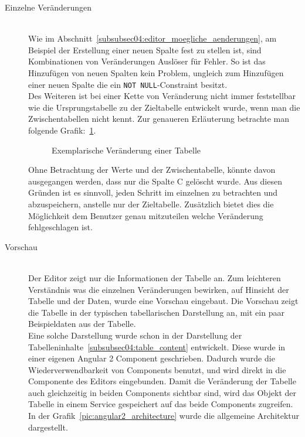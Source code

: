 \begin{description}
\item[Einzelne Veränderungen] \hfill\\
Wie im Abschnitt~\ref{subsubsec04:editor_moegliche_aenderungen}, am Beispiel der Erstellung einer neuen Spalte fest zu stellen ist, sind Kombinationen von Veränderungen Auslöser für Fehler. So ist das Hinzufügen von neuen Spalten kein Problem, ungleich zum Hinzufügen einer neuen Spalte die ein \texttt{NOT NULL}-Constraint besitzt. \\
Des Weiteren ist bei einer Kette von Veränderung nicht immer feststellbar wie die Ursprungstabelle zu der Zieltabelle entwickelt wurde, wenn man die Zwischentabellen nicht kennt.
Zur genaueren Erläuterung betrachte man folgende Grafik:~\ref{pic:table_chain_changes_example}. 

\begin{figure}[ht]
        \centering
        \caption{Exemplarische Veränderung einer Tabelle}
        \label{pic:table_chain_changes_example}
\end{figure}

Ohne Betrachtung der Werte und der Zwischentabelle, könnte davon ausgegangen werden, dass nur die Spalte C gelöscht wurde.
Aus diesen Gründen ist es sinnvoll, jeden Schritt im einzelnen zu betrachten und abzuspeichern, anstelle nur der Zieltabelle.
Zusätzlich bietet dies die Möglichkeit dem Benutzer genau mitzuteilen welche Veränderung fehlgeschlagen ist.


\item[Vorschau] \hfill\\
Der Editor zeigt nur die Informationen der Tabelle an. Zum leichteren Verständnis was die einzelnen Veränderungen bewirken, auf Hinsicht der Tabelle und der Daten, wurde eine Vorschau eingebaut. Die Vorschau zeigt die Tabelle in der typischen tabellarischen Darstellung an, mit ein paar Beispieldaten aus der Tabelle.\\
Eine solche Darstellung wurde schon in der Darstellung der Tabelleninhalte~\ref{subsubsec04:table_content} entwickelt. Diese wurde in einer eigenen Angular 2 Component geschrieben. Dadurch wurde die Wiederverwendbarkeit von Components benutzt, und wird direkt in die Componente des Editors eingebunden. Damit die Veränderung der Tabelle auch gleichzeitig in beiden Components sichtbar sind, wird das Objekt der Tabelle in einem Service gespeichert auf das beide Components zugreifen. In der Grafik~\ref{pic:angular2_architecture} wurde die allgemeine Architektur dargestellt.


\end{description}
